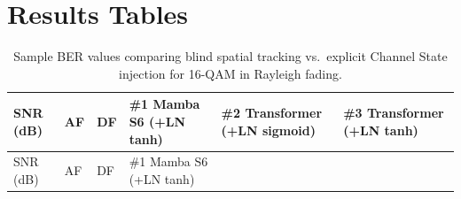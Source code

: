 \section{Results Tables}\label{sec:results-tables-4}

\begin{longtable}[]{@{}
  >{\raggedright\arraybackslash}p{}
  >{\raggedright\arraybackslash}p{}
  >{\raggedright\arraybackslash}p{}
  >{\raggedright\arraybackslash}p{}
  >{\raggedright\arraybackslash}p{}
  >{\raggedright\arraybackslash}p{}@{}}
\caption{Sample BER values comparing blind spatial tracking vs.~explicit Channel State injection for 16-QAM in Rayleigh fading.}\label{tbl:table18}\tabularnewline
\toprule\noalign{}
\begin{minipage}[b]{\linewidth}\raggedright
SNR (dB)
\end{minipage} & \begin{minipage}[b]{\linewidth}\raggedright
AF
\end{minipage} & \begin{minipage}[b]{\linewidth}\raggedright
DF
\end{minipage} & \begin{minipage}[b]{\linewidth}\raggedright
\#1 Mamba S6 (+LN tanh)
\end{minipage} & \begin{minipage}[b]{\linewidth}\raggedright
\#2 Transformer (+LN sigmoid)
\end{minipage} & \begin{minipage}[b]{\linewidth}\raggedright
\#3 Transformer (+LN tanh)
\end{minipage} \\
\midrule\noalign{}
\endfirsthead
\toprule\noalign{}
\begin{minipage}[b]{\linewidth}\raggedright
SNR (dB)
\end{minipage} & \begin{minipage}[b]{\linewidth}\raggedright
AF
\end{minipage} & \begin{minipage}[b]{\linewidth}\raggedright
DF
\end{minipage} & \begin{minipage}[b]{\linewidth}\raggedright
\#1 Mamba S6 (+LN tanh)
\end{minipage} & \begin{minipage}[b]{\linewidth}\raggedright

\end{minipage}
\end{longtable}
